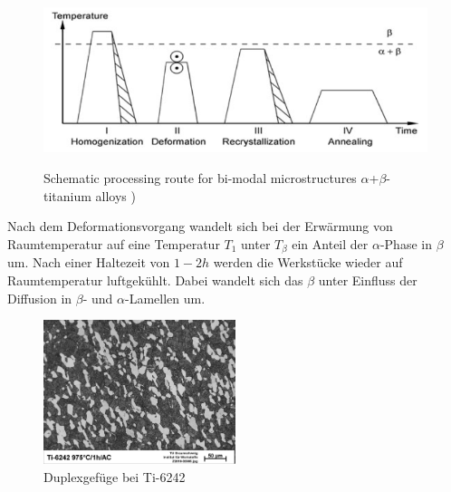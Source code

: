 \begin{figure}[H]
	
	\centering
	
	{\includegraphics[width=1\textwidth]{Bilder/WB}}			
	\caption{Schematic processing route for bi-modal microstructures $\alpha$+$\beta$-titanium alloys )}
	\label{fig:WB}
\end{figure}

Nach dem Deformationsvorgang wandelt sich bei der Erwärmung von Raumtemperatur  auf eine Temperatur $T_1$ unter $T_{\beta}$  ein Anteil der $\alpha$-Phase in $\beta$ um. Nach einer Haltezeit von $1-2h$ werden die Werkstücke wieder auf Raumtemperatur luftgekühlt.
Dabei wandelt sich das $\beta$ unter Einfluss der Diffusion in $\beta$- und $\alpha$-Lamellen um.

\begin{figure}[H]
	\centering
	\includegraphics[width=0.5\textwidth]{Bilder/LM-975-1h-AC}
	\caption{Duplexgefüge bei Ti-6242}
	\label{fig:L.M}
\end{figure}


